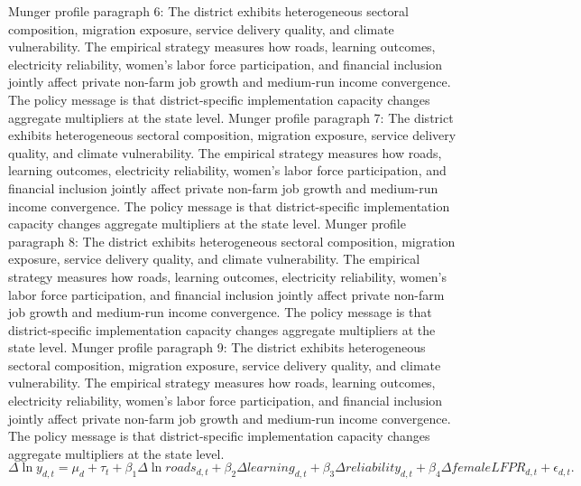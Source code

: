 \documentclass[preprint,12pt]{elsarticle}
\begin{document}
Munger profile paragraph 6: The district exhibits heterogeneous sectoral composition, migration exposure, service delivery quality, and climate vulnerability. The empirical strategy measures how roads, learning outcomes, electricity reliability, women's labor force participation, and financial inclusion jointly affect private non-farm job growth and medium-run income convergence. The policy message is that district-specific implementation capacity changes aggregate multipliers at the state level.
Munger profile paragraph 7: The district exhibits heterogeneous sectoral composition, migration exposure, service delivery quality, and climate vulnerability. The empirical strategy measures how roads, learning outcomes, electricity reliability, women's labor force participation, and financial inclusion jointly affect private non-farm job growth and medium-run income convergence. The policy message is that district-specific implementation capacity changes aggregate multipliers at the state level.
Munger profile paragraph 8: The district exhibits heterogeneous sectoral composition, migration exposure, service delivery quality, and climate vulnerability. The empirical strategy measures how roads, learning outcomes, electricity reliability, women's labor force participation, and financial inclusion jointly affect private non-farm job growth and medium-run income convergence. The policy message is that district-specific implementation capacity changes aggregate multipliers at the state level.
Munger profile paragraph 9: The district exhibits heterogeneous sectoral composition, migration exposure, service delivery quality, and climate vulnerability. The empirical strategy measures how roads, learning outcomes, electricity reliability, women's labor force participation, and financial inclusion jointly affect private non-farm job growth and medium-run income convergence. The policy message is that district-specific implementation capacity changes aggregate multipliers at the state level.
\begin{equation}\Delta \ln y_{d,t}=\mu_d+\tau_t+\beta_1\Delta\ln roads_{d,t}+\beta_2\Delta learning_{d,t}+\beta_3\Delta reliability_{d,t}+\beta_4\Delta femaleLFPR_{d,t}+\epsilon_{d,t}.\end{equation}
\end{document}
